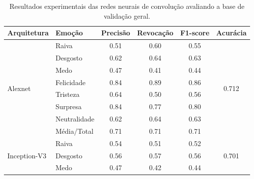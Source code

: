 \begin{table}[]
\centering
\caption{Resultados experimentais das redes neurais de convolução avaliando a base de validação geral.}
\label{table:resultsexp}
\begin{tabular}{llcccc}
\hline
\textbf{Arquitetura}                & \textbf{Emoção}       & \textbf{Precisão} & \textbf{Revocação} & \textbf{F1-score} & \textbf{Acurácia}               \\ \hline
\multirow{8}{*}{Alexnet}            & Raiva                 & 0.51              & 0.60               & 0.55              & \multirow{8}{*}{0.712}          \\
                                    & Desgosto              & 0.62              & 0.64               & 0.63              &                                 \\
                                    & Medo                  & 0.47              & 0.41               & 0.44              &                                 \\
                                    & Felicidade            & 0.84              & 0.89               & 0.86              &                                 \\
                                    & Tristeza              & 0.64              & 0.50               & 0.56              &                                 \\
                                    & Surpresa              & 0.84              & 0.77               & 0.80              &                                 \\
                                    & Neutralidade          & 0.62              & 0.64               & 0.63              &                                 \\
                                    & Média/Total           & 0.71              & 0.71               & 0.71              &                                 \\ \hline
\multirow{8}{*}{Inception-V3}       & Raiva                 & 0.54              & 0.51               & 0.52              & \multirow{8}{*}{0.701}          \\
                                    & Desgosto              & 0.56              & 0.57               & 0.56              &                                 \\
                                    & Medo                  & 0.47              & 0.42               & 0.44              &                                 \\

\end{tabular}
\end{table}

